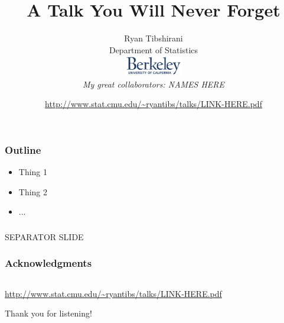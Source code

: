 \documentclass[mathserif]{beamer} %
\title{A Talk You Will Never Forget}
\author{\large Ryan Tibshirani \\
Department of Statistics \\
\smallskip 
\includegraphics[height=0.35in]{ucb.png} \\
\bigskip
\normalsize
{\it My great collaborators: NAMES HERE}}
\date{\footnotesize
\url{http://www.stat.cmu.edu/~ryantibs/talks/LINK-HERE.pdf}}
\begin{document}
\begin{frame}
\bigskip
\maketitle
\thispagestyle{empty}
\end{frame} 
\addtocounter{framenumber}{-1}

\begin{frame}
\frametitle{}
\end{frame}

\begin{frame}
\frametitle{Outline}
\begin{itemize}
\item Thing 1
\item Thing 2
\item ...
\end{itemize}
\end{frame}

\begin{frame}
\frametitle{}
\centering\Large\blue 
\bigskip
SEPARATOR SLIDE
\end{frame}

\begin{frame}
\frametitle{Acknowledgments}
\begin{center}
\begin{tabular}{ccc}
\end{tabular}

\bigskip
{\small
\url{http://www.stat.cmu.edu/~ryantibs/talks/LINK-HERE.pdf}}

\bigskip
Thank you for listening!
\end{center}
\end{frame}
\end{document}
